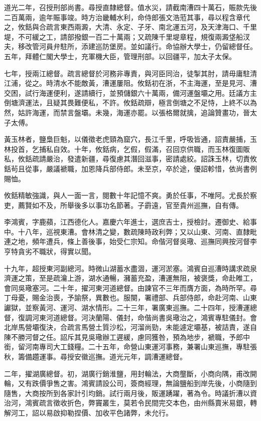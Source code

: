 \begin{pinyinscope}
道光二年，召授刑部尚書。尋授直隸總督。值水災，請截南漕四十萬石，賑款先後二百萬兩，逾年賑事竣。時方治畿輔水利，命侍郎張文浩蒞其事，尋以程含章代之，攸銛與合疏言東西兩澱，大清、永定、子牙、南北運五河，及天津海口、千里堤，不可緩之工，請部撥銀一百二十萬兩；又疏陳千里堤章程，規復兩澱垡船汊夫，移改管河員弁駐所，添建巡防堡房。並如議行。命協辦大學士，仍留總督任。五年，拜體仁閣大學士，充軍機大臣，管理刑部。以回疆平，加太子太保。

七年，授兩江總督。疏言總督於河務非專責，與河臣同治，徒掣其肘，請毋庸駐清江浦，從之。時清水不能敵黃，漕運屢阻。攸銛初在浙，不主海運，至是見河、漕交困，試行海運便利，遂請續行，並預儲銀六十萬兩，備河運盤壩之用。廷議方主倒塘濟運法，且疑其畏難便私，不許。攸銛疏辯，極言倒塘之不足恃，上終不以為然，姑許海運，而禁言盤壩。未幾，海運亦罷。以張格爾就擒，追論贊畫功，晉太子太傅。

黃玉林者，鹽梟巨魁，以儀徵老虎頸為窟穴，長江千里，呼吸皆通，詔責嚴捕，玉林投首，乞捕私自效。十年，攸銛病，乞假，假滿，召回京供職，而玉林復圖販私，攸銛疏請嚴治，發遣新疆，尋復慮其潛回滋事，密請處絞。詔誅玉林，切責攸銛茍且從事，嚴議褫職，加恩降兵部侍郎。未至京，卒於途，優詔軫惜，依尚書例賜恤。

攸銛精敏強識，與人一面一言，閱數十年記憶不爽。勇於任事，不唯阿。尤長於察吏，薦賢如不及，所舉後多以事功名節著。子霨遠，官至貴州巡撫，自有傳。

李鴻賓，字鹿蘋，江西德化人。嘉慶六年進士，選庶吉士，授檢討。遷御史、給事中。十八年，巡視東漕。會林清之變，數疏陳時政利弊；又以山東、河南、直隸毗連之地，頻年遭兵，條上善後事，始受仁宗知。命偕河督吳璥、巡撫同興按河督李亨特貪劣不職狀，得實以聞。

十九年，超授東河副總河。時微山湖蓄水盡涸，運河淤塞。鴻賓自巡漕時講求疏泉濟運之策，至是疏瀹上游，湖水通暢，瀦蓄充盈，漕運無阻，被褒獎，命赴睢工，會同吳璥塞河。二十年，擢河東河道總督。由諫官不三年而膺方面，為時所罕。尋丁母憂，賜金治喪，予諭祭，異數也。服闋，署禮部、兵部侍郎，命赴河南、山東讞獄，並察黃河、運河、湖水情形。二十三年，署廣東巡撫。二十四年，授漕運總督，復調河東河道總督。河決蘭陽、儀封，命偕尚書吳璥治之，鴻賓專駐儀封。會北岸馬營壩復決，合疏言馬營土質沙松，河溜尚勁，未能遽定壩基，被詰責，遂自陳不勝河督之任。詔斥其見吳璥辦工遲緩，慮同獲咎，預為地步，褫職，予郎中銜，留河南專司大工錢糧。二十五年，命營山東運河事務，兼署山東巡撫，專駐張秋，籌備趲運事。尋授安徽巡撫。道光元年，調漕運總督。

二年，擢湖廣總督。初，湖廣行銷淮鹽，用封輪法，大商壟斷，小商向隅，甫改開輪，又有跌價爭售之害。鴻賓請設公司，簽商經理，無論鹽船到岸先後，小商隨到隨售，大商按所到各家計引均銷。試行兩月後，販運踴躍，著為令。時議折漕以資治河，鴻賓疏言徵收折色，弊竇叢生，莫若令民間完交本色，由州縣賣米易銀，轉解河工，詔以易啟抑勒捏價、加收平色諸弊，未允行。


\end{pinyinscope}
